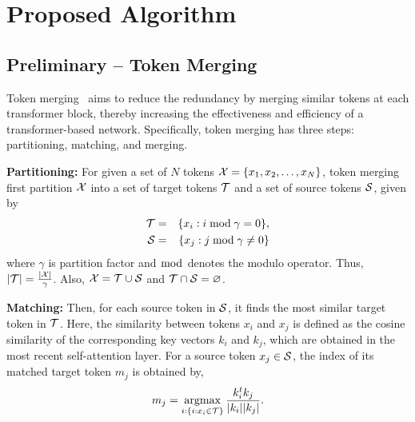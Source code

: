 \documentclass{article}
\DeclareMathOperator*{\argmax}{argmax}
\begin{document}
\vspace*{-0.3cm}
\section{Proposed Algorithm}
\label{sec:proposed}

\vspace*{-0.3cm}
\subsection{Preliminary -- Token Merging}
\vspace*{-0.2cm}
Token merging~\citep{bolya2022tome} aims to reduce the redundancy by merging similar tokens at each transformer block, thereby increasing the effectiveness and efficiency of a transformer-based network. Specifically, token merging has three steps: partitioning, matching, and merging. 

\vspace{0.1cm}
\noindent\textbf{Partitioning:} For given a set of $N$ tokens ${\cal X} = \{x_1, x_2, \ldots, x_N\}$, token merging first partition ${\cal X}$ into a set of target tokens $\cal T$ and a set of source tokens $\cal S$, given by 
\begin{eqnarray} 
{\cal T} &=& \{x_i : i \bmod \gamma = 0\}, \label{eq:partition_t} \\ 
{\cal S} &=& \{x_j : j \bmod \gamma \neq 0\} \label{eq:partition_s}
\end{eqnarray}
where $\gamma$ is partition factor and $\bmod$ denotes the modulo operator. Thus, $|{\cal T}| = \frac{|{\cal X}|}{\gamma}$. Also, ${\cal X} = {\cal T} \cup {\cal S}$ and ${\cal T} \cap {\cal S} = \varnothing$. 

\vspace{0.1cm}
\noindent\textbf{Matching:} Then, for each source token in $\cal S$, it finds the most similar target token in $\cal T$. Here, the similarity between tokens $x_i$ and $x_j$ is defined as the cosine similarity of the corresponding key vectors $k_i$ and $k_j$, which are obtained in the most recent self-attention layer. For a source token $x_j \in {\cal S}$, the index of its matched target token $m_j$ is obtained by,
\begin{equation} \label{eq:matching} 
m_j = \argmax_{i: \{i : x_i \in {\cal T}\}} {\frac{k^t_ik_j}{|k_i||k_j|}}.
\end{equation}
\end{document}
